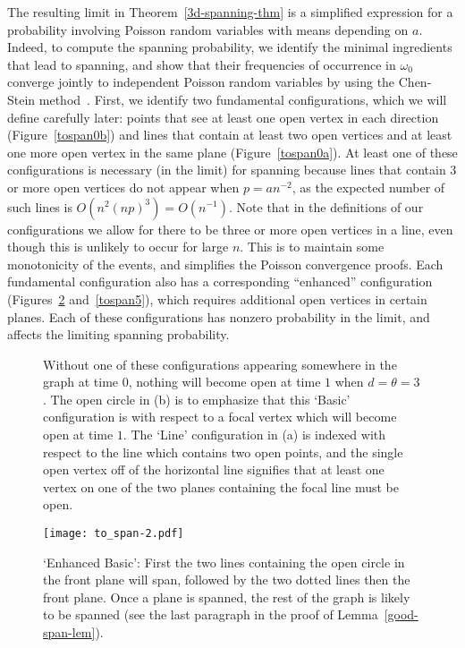 \documentclass{amsart}
\numberwithin{equation}{section}
\theoremstyle{definition}
\theoremstyle{remark}
\begin{document}
The resulting limit in Theorem~\ref{3d-spanning-thm} is a simplified expression for a probability involving Poisson random variables with means depending on $a$.  Indeed, to compute the spanning probability, we identify the minimal ingredients that lead to spanning, and show that their frequencies of occurrence in $\omega_0$ converge jointly to independent Poisson random variables by using the Chen-Stein method~\cite{poissonbook}.  First, we identify two fundamental configurations, which we will define carefully later: points that see at least one open vertex in each direction (Figure~\ref{tospan0b}) and lines that contain at least two open vertices and at least one more open vertex in the same plane (Figure~\ref{tospan0a}).  At least one of these configurations is necessary (in the limit) for spanning because lines that contain 3 or more open vertices do not appear when $p= an^{-2}$, as the expected number of such lines is $O(n^2 (np)^3) = O(n^{-1})$.  Note that in the definitions of our configurations we allow for there to be three or more open vertices in a line, even though this is unlikely to occur for large $n$.  This is to maintain some monotonicity of the events, and simplifies the Poisson convergence proofs.  Each fundamental configuration also has a corresponding ``enhanced'' configuration (Figures~\ref{tospan2} and~\ref{tospan5}), which requires additional open vertices in certain planes.  Each of these configurations has nonzero probability in the limit, and affects the limiting spanning probability.
\begin{figure}[htd]
	\centering
	\hspace{.2in}
	\caption{Without one of these configurations appearing somewhere in the graph at time $0$, nothing will become open at time $1$ when $d=\theta=3$.  The open circle in (b) is to emphasize that this `Basic' configuration is with respect to a focal vertex which will become open at time $1$.  The `Line' configuration in (a) is indexed with respect to the line which contains two open points, and the single open vertex off of the horizontal line signifies that at least one vertex on one of the two planes containing the focal line must be open.}
	\label{tospan0}
\end{figure}

\begin{figure}[htd]
	\centering
	\texttt{[image: to\_span-2.pdf]}
	\caption{`Enhanced Basic': First the two lines containing the open circle in the front plane will span, followed by the two dotted lines then the front plane. Once a plane is spanned, the rest of the graph is likely to be spanned (see the last paragraph in the proof of Lemma~\ref{good-span-lem}).}
	\label{tospan2}
\end{figure}
\end{document}
